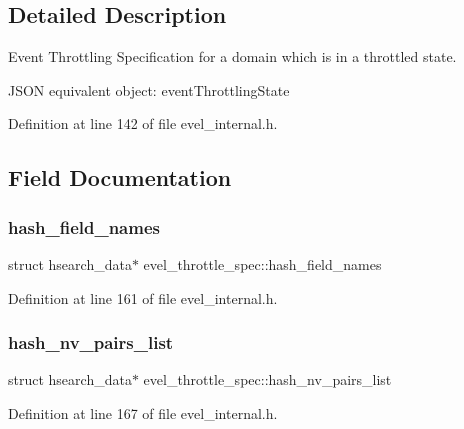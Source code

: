 \subsection{Detailed Description}
Event Throttling Specification for a domain which is in a throttled state. 

J\+S\+ON equivalent object\+: event\+Throttling\+State 

Definition at line 142 of file evel\+\_\+internal.\+h.



\subsection{Field Documentation}
\hypertarget{structevel__throttle__spec_a9d52da1ea954b560729797975c2a0216}{}\label{structevel__throttle__spec_a9d52da1ea954b560729797975c2a0216} 
\subsubsection{\texorpdfstring{hash\+\_\+field\+\_\+names}{hash\_field\_names}}
{\footnotesize\ttfamily struct hsearch\+\_\+data$\ast$ evel\+\_\+throttle\+\_\+spec\+::hash\+\_\+field\+\_\+names}



Definition at line 161 of file evel\+\_\+internal.\+h.

\hypertarget{structevel__throttle__spec_a2abbbfc9889e07e4a5aeaf8a8ec6f2ae}{}\label{structevel__throttle__spec_a2abbbfc9889e07e4a5aeaf8a8ec6f2ae} 
\subsubsection{\texorpdfstring{hash\+\_\+nv\+\_\+pairs\+\_\+list}{hash\_nv\_pairs\_list}}
{\footnotesize\ttfamily struct hsearch\+\_\+data$\ast$ evel\+\_\+throttle\+\_\+spec\+::hash\+\_\+nv\+\_\+pairs\+\_\+list}



Definition at line 167 of file evel\+\_\+internal.\+h.

